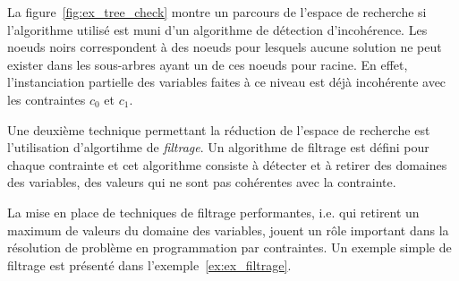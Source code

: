 \begin{ex}
La figure~\ref{fig:ex_tree_check} montre un parcours de l'espace de
recherche si l'algorithme utilisé est muni d'un algorithme de
détection d'incohérence. Les noeuds noirs correspondent à des noeuds
pour lesquels aucune solution ne peut exister dans les sous-arbres
ayant un de ces noeuds pour racine. En effet, l'instanciation
partielle des variables faites à ce niveau est déjà incohérente avec
les contraintes $c_0$ et $c_1$.
\end{ex}


Une deuxième technique permettant la réduction de l'espace de
recherche est l'utilisation d'algortihme de {\it filtrage}. Un
algorithme de filtrage est défini pour chaque contrainte et cet
algorithme consiste à détecter et à retirer des domaines
des variables, des valeurs qui ne sont pas cohérentes avec la
contrainte.

 La mise en place de techniques de filtrage performantes,
i.e. qui retirent un maximum de valeurs du domaine des variables,
jouent un rôle important dans la résolution de problème en
programmation par contraintes. Un exemple simple de filtrage est
présenté dans l'exemple~\ref{ex:ex_filtrage}.

